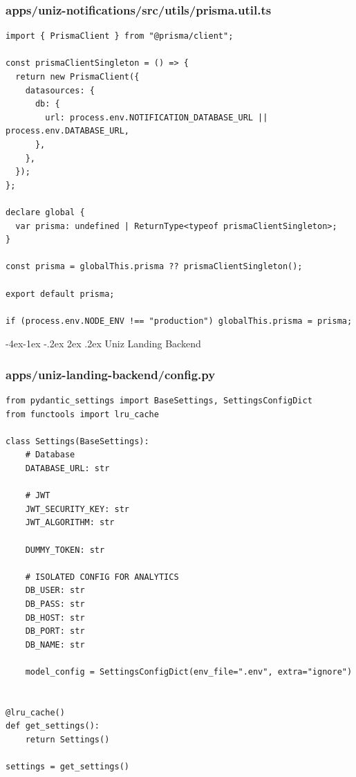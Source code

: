 \documentclass[11pt,a4paper,oneside]{article}
\makeatletter
\renewcommand{\subsection}{\@startsection{subsection}{2}{\z@}%
    {-4ex\@plus -1ex \@minus -.2ex}%
    {2ex \@plus .2ex}%
    {\normalfont\Large\bfseries\color{accent}}}
\makeatother
\begin{document}
\subsubsection*{apps/uniz-notifications/src/utils/prisma.util.ts}
\begin{lstlisting}
import { PrismaClient } from "@prisma/client";

const prismaClientSingleton = () => {
  return new PrismaClient({
    datasources: {
      db: {
        url: process.env.NOTIFICATION_DATABASE_URL || process.env.DATABASE_URL,
      },
    },
  });
};

declare global {
  var prisma: undefined | ReturnType<typeof prismaClientSingleton>;
}

const prisma = globalThis.prisma ?? prismaClientSingleton();

export default prisma;

if (process.env.NODE_ENV !== "production") globalThis.prisma = prisma;

\end{lstlisting}

\subsection{Uniz Landing Backend}
\subsubsection*{apps/uniz-landing-backend/config.py}
\begin{lstlisting}
from pydantic_settings import BaseSettings, SettingsConfigDict
from functools import lru_cache

class Settings(BaseSettings):
    # Database
    DATABASE_URL: str

    # JWT
    JWT_SECURITY_KEY: str
    JWT_ALGORITHM: str

    DUMMY_TOKEN: str

    # ISOLATED CONFIG FOR ANALYTICS
    DB_USER: str
    DB_PASS: str
    DB_HOST: str 
    DB_PORT: str
    DB_NAME: str

    model_config = SettingsConfigDict(env_file=".env", extra="ignore")


@lru_cache()
def get_settings():
    return Settings()

settings = get_settings()
\end{lstlisting}
\end{document}
